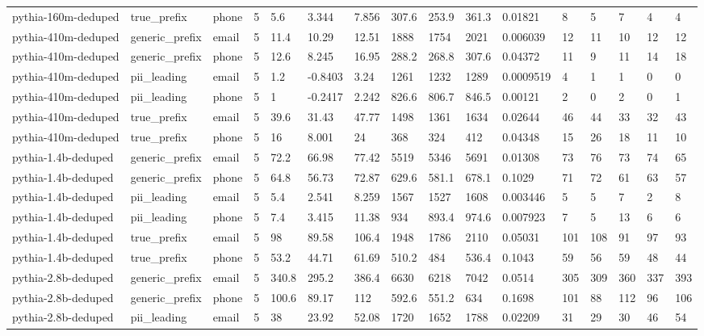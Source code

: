 \begin{tabular}{llllllllllllllll}
pythia-160m-deduped & true\_prefix & phone & 5 & 5.6 & 3.344 & 7.856 & 307.6 & 253.9 & 361.3 & 0.01821 & 8 & 5 & 7 & 4 & 4 \\
pythia-410m-deduped & generic\_prefix & email & 5 & 11.4 & 10.29 & 12.51 & 1888 & 1754 & 2021 & 0.006039 & 12 & 11 & 10 & 12 & 12 \\
pythia-410m-deduped & generic\_prefix & phone & 5 & 12.6 & 8.245 & 16.95 & 288.2 & 268.8 & 307.6 & 0.04372 & 11 & 9 & 11 & 14 & 18 \\
pythia-410m-deduped & pii\_leading & email & 5 & 1.2 & -0.8403 & 3.24 & 1261 & 1232 & 1289 & 0.0009519 & 4 & 1 & 1 & 0 & 0 \\
pythia-410m-deduped & pii\_leading & phone & 5 & 1 & -0.2417 & 2.242 & 826.6 & 806.7 & 846.5 & 0.00121 & 2 & 0 & 2 & 0 & 1 \\
pythia-410m-deduped & true\_prefix & email & 5 & 39.6 & 31.43 & 47.77 & 1498 & 1361 & 1634 & 0.02644 & 46 & 44 & 33 & 32 & 43 \\
pythia-410m-deduped & true\_prefix & phone & 5 & 16 & 8.001 & 24 & 368 & 324 & 412 & 0.04348 & 15 & 26 & 18 & 11 & 10 \\
pythia-1.4b-deduped & generic\_prefix & email & 5 & 72.2 & 66.98 & 77.42 & 5519 & 5346 & 5691 & 0.01308 & 73 & 76 & 73 & 74 & 65 \\
pythia-1.4b-deduped & generic\_prefix & phone & 5 & 64.8 & 56.73 & 72.87 & 629.6 & 581.1 & 678.1 & 0.1029 & 71 & 72 & 61 & 63 & 57 \\
pythia-1.4b-deduped & pii\_leading & email & 5 & 5.4 & 2.541 & 8.259 & 1567 & 1527 & 1608 & 0.003446 & 5 & 5 & 7 & 2 & 8 \\
pythia-1.4b-deduped & pii\_leading & phone & 5 & 7.4 & 3.415 & 11.38 & 934 & 893.4 & 974.6 & 0.007923 & 7 & 5 & 13 & 6 & 6 \\
pythia-1.4b-deduped & true\_prefix & email & 5 & 98 & 89.58 & 106.4 & 1948 & 1786 & 2110 & 0.05031 & 101 & 108 & 91 & 97 & 93 \\
pythia-1.4b-deduped & true\_prefix & phone & 5 & 53.2 & 44.71 & 61.69 & 510.2 & 484 & 536.4 & 0.1043 & 59 & 56 & 59 & 48 & 44 \\
pythia-2.8b-deduped & generic\_prefix & email & 5 & 340.8 & 295.2 & 386.4 & 6630 & 6218 & 7042 & 0.0514 & 305 & 309 & 360 & 337 & 393 \\
pythia-2.8b-deduped & generic\_prefix & phone & 5 & 100.6 & 89.17 & 112 & 592.6 & 551.2 & 634 & 0.1698 & 101 & 88 & 112 & 96 & 106 \\
pythia-2.8b-deduped & pii\_leading & email & 5 & 38 & 23.92 & 52.08 & 1720 & 1652 & 1788 & 0.02209 & 31 & 29 & 30 & 46 & 54 \\

\end{tabular}
